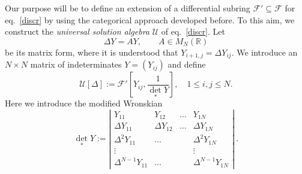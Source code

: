 \documentclass[10pt]{amsart}
\numberwithin{equation}{section}
\theoremstyle{definition}
\begin{document}
Our purpose will be to define an extension of a differential subring $\mathcal{F}'\subseteq \mathcal{F}$ for eq.~\eqref{discr} by using the categorical approach developed before. To this aim, we construct the \textit{universal solution algebra} $\mathcal{U}$ of eq.~\eqref{discr}.
Let
\begin{equation}
\Delta Y =AY,\qquad A\in M_N(\mathbb{R})
\label{matrixdiff}
\end{equation}
be its matrix form, where it is understood that
$Y_{i+1,j}=\Delta Y_{ij}$. We introduce an $N\times N$ matrix of indeterminates
$Y=(Y_{ij})$ and define
\begin{equation}
\mathcal{U}[\Delta ]:=\mathcal{F}'\left [Y_{ij},
\frac{1}{{\det}_* Y}\right ], \quad 1\leq i,j\leq N.
\label{eq7.4}
\end{equation}
Here we introduce the modified Wronskian
\begin{equation}
\label{wronsk}
{\det}_* Y:=
\left|\begin{matrix}
Y_{11} &Y_{12}&\ldots & Y_{1N}
\\
\Delta Y_{11}&\Delta Y_{12}&\ldots &\Delta Y_{1N}
\\
\Delta ^{2} Y_{11}&\ldots & & \Delta ^{2} Y_{1N}
\\
\vdots & & &\vdots
\\
\Delta ^{N-1}Y_{11}&\ldots & &\Delta ^{N-1} Y_{1N}
\end{matrix}\right|
\ .
\end{equation}
\end{document}
